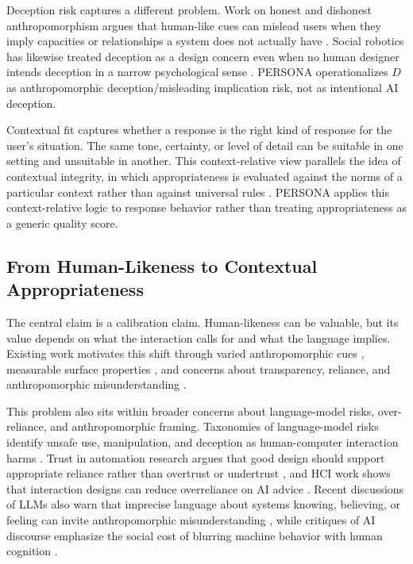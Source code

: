 \documentclass[manuscript,review,anonymous]{acmart}
\begin{document}
Deception risk captures a different problem. Work on honest and dishonest anthropomorphism argues that human-like cues can mislead users when they imply capacities or relationships a system does not actually have \cite{kaminski2017,leong2019}. Social robotics has likewise treated deception as a design concern even when no human designer intends deception in a narrow psychological sense \cite{sharkey2021}. PERSONA operationalizes $D$ as anthropomorphic deception/misleading implication risk, not as intentional AI deception.

Contextual fit captures whether a response is the right kind of response for the user's situation. The same tone, certainty, or level of detail can be suitable in one setting and unsuitable in another. This context-relative view parallels the idea of contextual integrity, in which appropriateness is evaluated against the norms of a particular context rather than against universal rules \cite{nissenbaum2004}. PERSONA applies this context-relative logic to response behavior rather than treating appropriateness as a generic quality score.

\subsection{From Human-Likeness to Contextual Appropriateness}

The central claim is a calibration claim. Human-likeness can be valuable, but its value depends on what the interaction calls for and what the language implies. Existing work motivates this shift through varied anthropomorphic cues \cite{devrio2025}, measurable surface properties \cite{cheng2025}, and concerns about transparency, reliance, and anthropomorphic misunderstanding \cite{abercrombie2023,leong2019,sharkey2021}.

This problem also sits within broader concerns about language-model risks, over-reliance, and anthropomorphic framing. Taxonomies of language-model risks identify unsafe use, manipulation, and deception as human-computer interaction harms \cite{Weidinger2022Risks}. Trust in automation research argues that good design should support appropriate reliance rather than overtrust or undertrust \cite{lee2004}, and HCI work shows that interaction designs can reduce overreliance on AI advice \cite{Bucinca2021CognitiveForcing}. Recent discussions of LLMs also warn that imprecise language about systems knowing, believing, or feeling can invite anthropomorphic misunderstanding \cite{Shanahan2024Talking}, while critiques of AI discourse emphasize the social cost of blurring machine behavior with human cognition \cite{bender2024}.
\end{document}
